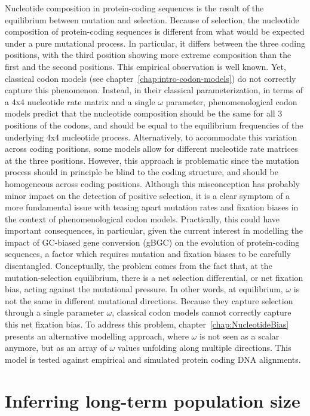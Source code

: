 Nucleotide composition in protein-coding sequences is the result of the equilibrium between mutation and selection.
Because of selection, the nucleotide composition of protein-coding sequences is different from what would be expected under a pure mutational process.
In particular, it differs between the three coding positions, with the third position showing more extreme composition than the first and the second positions.
This empirical observation is well known.
Yet, classical codon models (see chapter~\ref{chap:intro-codon-models}) do not correctly capture this phenomenon.
Instead, in their classical parameterization, in terms of a 4x4 nucleotide rate matrix and a single $\omega$ parameter, phenomenological codon models predict that the nucleotide composition should be the same for all $3$ positions of the codons, and should be equal to the equilibrium frequencies of the underlying 4x4 nucleotide process.
Alternatively, to accommodate this variation across coding positions, some models allow for different nucleotide rate matrices at the three positions.
However, this approach is problematic since the mutation process should in principle be blind to the coding structure, and should be homogeneous across coding positions.
Although this misconception has probably minor impact on the detection of positive selection, it is a clear symptom of a more fundamental issue with teasing apart mutation rates and fixation biases in the context of phenomenological codon models.
Practically, this could have important consequences, in particular, given the current interest in modelling the impact of GC-biased gene conversion (\acrshort{gBGC}) on the evolution of protein-coding sequences, a factor which requires mutation and fixation biases to be carefully disentangled.
Conceptually, the problem comes from the fact that, at the mutation-selection equilibrium, there is a net selection differential, or net fixation bias, acting against the mutational pressure.
In other words, at equilibrium, $\omega$ is not the same in different mutational directions.
Because they capture selection through a single parameter $\omega$, classical codon models cannot correctly capture this net fixation bias.
To address this problem, chapter~\ref{chap:NucleotideBias} presents an alternative modelling approach, where $\omega$ is not seen as a scalar anymore, but as an array of $\omega$ values unfolding along multiple directions.
This model is tested against empirical and simulated protein coding \acrshort{DNA} alignments.


\section{Inferring long-term population size}
\label{sec-goals:MutSelDrift}

